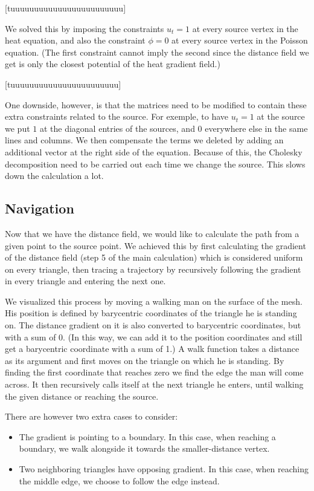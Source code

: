 \documentclass[a4paper,12pt,twoside]{article}
\begin{document}
[tuuuuuuuuuuuuuuuuuuuuuuuu]

We solved this by imposing the constraints $u_t = 1$ at every source vertex in the heat equation, and also the constraint $\phi = 0$ at every source vertex in the Poisson equation. (The first constraint cannot imply the second since the distance field we get is only the closest potential of the heat gradient field.)

[tuuuuuuuuuuuuuuuuuuuuuuu]

One downside, however, is that the matrices need to be modified to contain these extra constraints related to the source. For exemple, to have $u_t = 1$ at the source we put $1$ at the diagonal entries of the sources, and $0$ everywhere else in the same lines and columns. We then compensate the terms we deleted by adding an additional vector at the right side of the equation. Because of this, the Cholesky decomposition need to be carried out each time we change the source. This slows down the calculation a lot.

\subsection{Navigation}

Now that we have the distance field, we would like to calculate the path from a given point to the source point. We achieved this by first calculating the gradient of the distance field (step 5 of the main calculation) which is considered uniform on every triangle, then tracing a trajectory by recursively following the gradient in every triangle and entering the next one. 

We visualized this process by moving a walking man on the surface of the mesh. His position is defined by barycentric coordinates of the triangle he is standing on. The distance gradient on it is also converted to barycentric coordinates, but with a sum of 0. (In this way, we can add it to the position coordinates and still get a barycentric coordinate with a sum of 1.) A walk function takes a distance as its argument and first moves on the triangle on which he is standing. By finding the first coordinate that reaches zero we find the edge the man will come across. It then recursively calls itself at the next triangle he enters, until walking the given distance or reaching the source.

There are however two extra cases to consider:
\begin{itemize}
\item
The gradient is pointing to a boundary. In this case, when reaching a boundary, we walk alongside it towards the smaller-distance vertex.
\item
Two neighboring triangles have opposing gradient. In this case, when reaching the middle edge, we choose to follow the edge instead.
\end{itemize}
\end{document}

